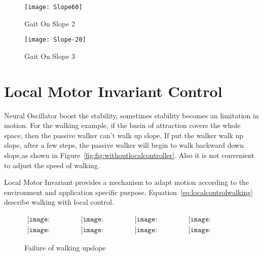 \begin{figure}[!htbp]
  \begin{center}
      \texttt{[image: Slope60]}
    \caption{Gait On Slope 2}
    \label{fig:ss2}
\end{center}
\end{figure}

\begin{figure}[!htbp]
  \begin{center}
      \texttt{[image: Slope-20]}
    \caption{Gait On Slope 3}
    \label{fig:ss3}
\end{center}
\end{figure}






\section{Local Motor Invariant Control}
Neural Oscillator boost the stability, sometimes stability becomes an limitation in motion.
For the walking example, if the basin of attraction covers the whole space, then the passive walker can't walk up slope.
If put the walker walk up slope, after a few steps, the passive walker will begin to walk backward down slope,as shown in Figure~\ref{fig:fig:withoutlocalcontroller}.
Also it is not convenient to adjust the speed of walking.

Local Motor Invariant provides a mechanism to adapt motion according to the environment and application specific purpose.
Equation~\ref{eq:localcontrolwalking} describe walking with local control.


\begin{figure}[!htbp]
  \begin{center}
         $\begin{array}{cccc}
\texttt{[image: UpFall/0001.eps]}&
\texttt{[image: UpFall/0051.eps]}&
\texttt{[image: UpFall/0101.eps]}&
\texttt{[image: UpFall/0151.eps]}
\\
\texttt{[image: UpFall/0201.eps]}&
\texttt{[image: UpFall/0251.eps]}&
\texttt{[image: UpFall/0301.eps]}&
\texttt{[image: UpFall/0351.eps]}
\end{array}$
    \caption{Failure of walking upslope}
    \label{fig:localcontrolwalking}
\end{center}
\end{figure}

